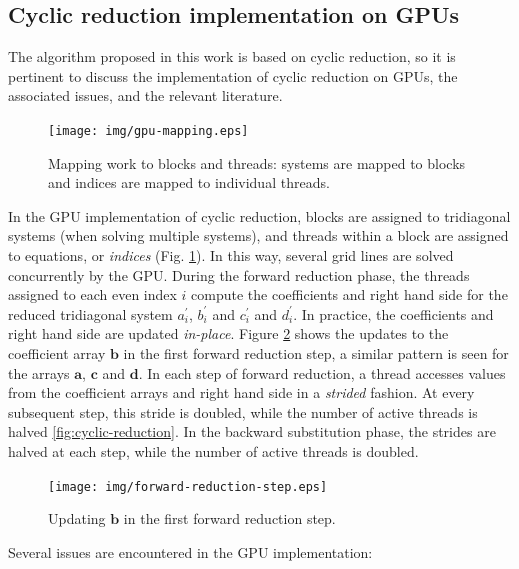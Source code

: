 \subsection{Cyclic reduction implementation on GPUs}
\label{subsec:cyclic-reduction-gpu-implementation}

The algorithm proposed in this work is based on cyclic reduction,
so it is pertinent to discuss the
implementation of cyclic reduction on GPUs,
the associated issues,
and the relevant literature.

\begin{figure}
\begin{center}
\texttt{[image: img/gpu-mapping.eps]}
\end{center}
\caption{Mapping work to blocks and threads:
systems are mapped to blocks and
indices are mapped to individual threads.}
\label{fig:gpu-mapping}
\end{figure}
%
In the GPU implementation of cyclic reduction,
blocks are assigned to tridiagonal systems
(when solving multiple systems),
and threads within a block 
are assigned to equations, or \emph{indices}
(Fig. \ref{fig:gpu-mapping}).
In this way, several grid lines are solved concurrently
by the GPU.
During the forward reduction phase,
the threads assigned to each even index $i$
compute the coefficients
and right hand side for the reduced tridiagonal system
$a_i^\prime$, $b_i^\prime$ and $c_i^\prime$
and $d_i^\prime$.
In practice, the coefficients and right hand side
are updated \emph{in-place}.
Figure \ref{fig:forward-reduction-step} shows the updates
to the coefficient array $\bm{b}$
in the first forward reduction step,
a similar pattern is seen for the arrays
$\bm{a}$, $\bm{c}$ and $\bm{d}$.
In each step of forward reduction,
a thread accesses values from the
coefficient arrays and right hand side
in a \emph{strided} fashion.
At every subsequent step,
this stride is doubled, while the number of active threads is halved
\ref{fig:cyclic-reduction}.
In the backward substitution phase,
the strides are halved at each step,
while the number of active threads is doubled.

\begin{figure}
\begin{center}
\texttt{[image: img/forward-reduction-step.eps]}
\end{center}
\caption{Updating $\bm{b}$ in the first forward reduction step.}
\label{fig:forward-reduction-step}
\end{figure}

Several issues are encountered in the GPU implementation:

